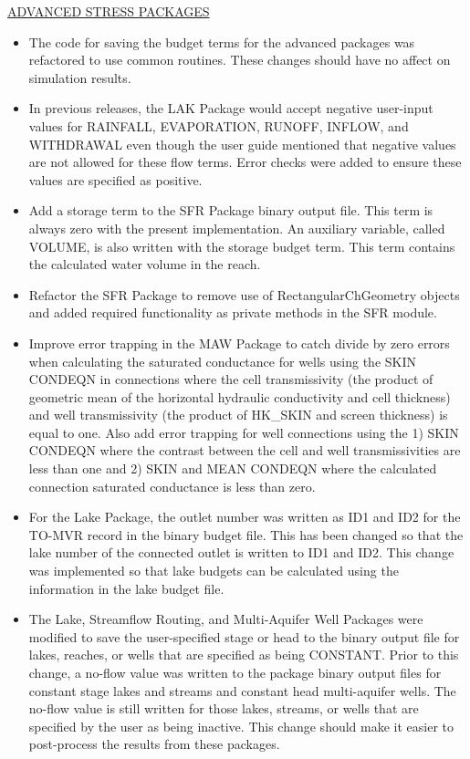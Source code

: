 \documentclass[11pt,twoside,twocolumn]{usgsreport}
\begin{document}
\begin{itemize}
	\underline{ADVANCED STRESS PACKAGES}
	\begin{itemize}
		\item The code for saving the budget terms for the advanced packages was refactored to use common routines.  These changes should have no affect on simulation results.
		\item In previous releases, the LAK Package would accept negative user-input values for  RAINFALL, EVAPORATION, RUNOFF, INFLOW, and WITHDRAWAL even though the user guide mentioned that negative values are not allowed for these flow terms.  Error checks were added to ensure these values are specified as positive.
		\item Add a storage term to the SFR Package binary output file.  This term is always zero with the present implementation.  An auxiliary variable, called VOLUME, is also written with the storage budget term.  This term contains the calculated water volume in the reach.
		\item Refactor the SFR Package to remove use of RectangularChGeometry objects and added required functionality as private methods in the SFR module.
		\item  Improve error trapping in the MAW Package to catch divide by zero errors when calculating the saturated conductance for wells using the SKIN CONDEQN in connections where the cell  transmissivity (the product of geometric mean of the horizontal hydraulic conductivity and cell thickness) and well transmissivity (the product of HK\_SKIN and screen thickness) is equal to one. Also add error trapping for well connections using the 1) SKIN CONDEQN where the contrast between the cell and well transmissivities are less than one and 2) SKIN and MEAN CONDEQN where the calculated connection saturated conductance is less than zero.
		\item For the Lake Package, the outlet number was written as ID1 and ID2 for the TO-MVR record in the binary budget file.  This has been changed so that the lake number of the connected outlet is written to ID1 and ID2.  This change was implemented so that lake budgets can be calculated using the information in the lake budget file.
		\item The Lake, Streamflow Routing, and Multi-Aquifer Well Packages were modified to save the user-specified stage or head to the binary output file for lakes, reaches, or wells that are specified as being CONSTANT.  Prior to this change, a no-flow value was written to the package binary output files for constant stage lakes and streams and constant head multi-aquifer wells.  The no-flow value is still written for those lakes, streams, or wells that are specified by the user as being inactive.  This change should make it easier to post-process the results from these packages.
	\end{itemize}


\end{itemize}
\end{document}
